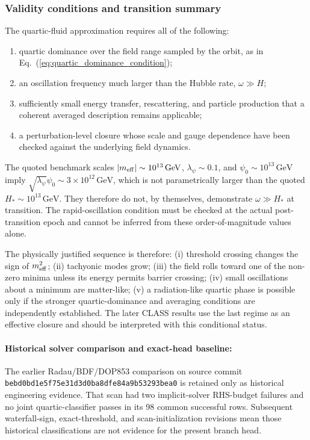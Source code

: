 \documentclass[epj]{svjour}
\begin{document}
\subsubsection{Validity conditions and transition summary}

The quartic-fluid approximation requires all of the following:
\begin{enumerate}
\item quartic dominance over the field range sampled by the orbit,
      as in Eq.~(\ref{eq:quartic_dominance_condition});
\item an oscillation frequency much larger than the Hubble rate,
      $\omega\gg H$;
\item sufficiently small energy transfer, rescattering, and particle
      production that a coherent averaged description remains applicable;
\item a perturbation-level closure whose scale and gauge dependence have
      been checked against the underlying field dynamics.
\end{enumerate}
The quoted benchmark scales $|m_{\rm eff}|\sim10^{13}\,\mathrm{GeV}$,
$\lambda_\psi\sim0.1$, and $\psi_0\sim10^{13}\,\mathrm{GeV}$ imply
$\sqrt{\lambda_\psi}\psi_0\sim3\times10^{12}\,\mathrm{GeV}$, which is
not parametrically larger than the quoted $H_*\sim10^{13}\,\mathrm{GeV}$.
They therefore do not, by themselves, demonstrate $\omega\gg H_*$ at
transition. The rapid-oscillation condition must be checked at the actual
post-transition epoch and cannot be inferred from these order-of-magnitude
values alone.

The physically justified sequence is therefore: (i) threshold crossing
changes the sign of $m_{\rm eff}^2$; (ii) tachyonic modes grow; (iii) the
field rolls toward one of the non-zero minima unless its energy permits
barrier crossing; (iv) small oscillations about a minimum are matter-like;
(v) a radiation-like quartic phase is possible only if the stronger
quartic-dominance and averaging conditions are independently established.
The later CLASS results use the last regime as an effective closure and
should be interpreted with this conditional status.

\paragraph{Historical solver comparison and exact-head baseline:}
The earlier Radau/BDF/DOP853 comparison on source commit
\texttt{bebd0bd1e5f75e31d3d0ba8dfe84a9b53293bea0} is retained only
as historical engineering evidence. That scan had two implicit-solver
RHS-budget failures and no joint quartic-classifier passes in its
98 common successful rows. Subsequent waterfall-sign, exact-threshold,
and scan-initialization revisions mean those historical classifications
are not evidence for the present branch head.
\end{document}

